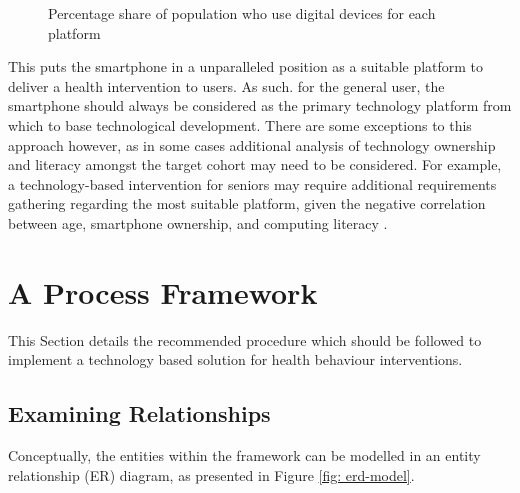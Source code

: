 \begin{figure}[h]
	\caption{Percentage share of population who use digital devices for each platform}
    \label{fig: graph-internetuse}
\end{figure}

This puts the smartphone in a unparalleled position as a suitable platform to deliver a health intervention to users. As such. for the general user, the smartphone should always be considered as the primary technology platform from which to base technological development.
There are some exceptions to this approach however, as in some cases additional analysis of technology ownership and literacy amongst the target cohort may need to be considered. For example, a technology-based intervention for seniors may require additional requirements gathering regarding the most suitable platform, given the negative correlation between age, smartphone ownership, and computing literacy \cite{Migo2015}.

\section{A Process Framework}
This Section details the recommended procedure which should be followed to implement a technology based solution for health behaviour interventions.

\subsection{Examining Relationships}
Conceptually, the entities within the framework can be modelled in an entity relationship (ER) diagram, as presented in Figure \ref{fig: erd-model}.

